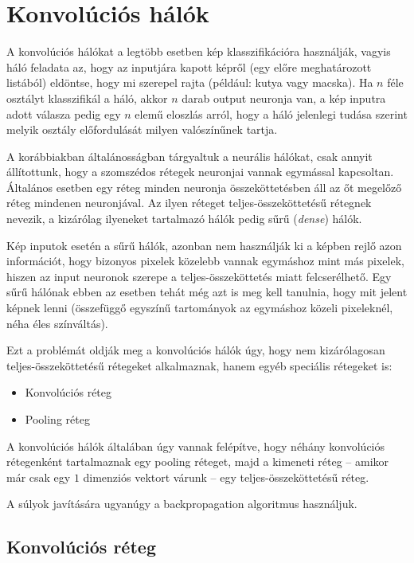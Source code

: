 \section{Konvolúciós hálók}

A konvolúciós hálókat \cite{ConvNet} a legtöbb esetben kép klasszifikációra használják, vagyis háló feladata az, hogy az inputjára kapott képről (egy előre meghatározott listából) eldöntse, hogy  mi szerepel rajta (például: kutya vagy macska). Ha $n$ féle osztályt klasszifikál a háló, akkor $n$ darab output neuronja van, a kép inputra adott válasza pedig egy $n$ elemű eloszlás arról, hogy a háló jelenlegi tudása szerint melyik osztály előfordulását milyen valószínűnek tartja.

A korábbiakban általánosságban tárgyaltuk a neurális hálókat, csak annyit állítottunk, hogy a szomszédos rétegek neuronjai vannak egymással kapcsoltan. Általános esetben egy réteg minden neuronja összeköttetésben áll az őt megelőző réteg mindenen neuronjával. Az ilyen réteget teljes-összeköttetésű rétegnek nevezik, a kizárólag ilyeneket tartalmazó hálók pedig sűrű (\emph{dense}) hálók.

Kép inputok esetén a sűrű hálók, azonban nem használják ki a képben rejlő azon információt, hogy bizonyos pixelek közelebb vannak egymáshoz mint más pixelek, hiszen az input neuronok szerepe a teljes-összeköttetés miatt felcserélhető. Egy sűrű hálónak ebben az esetben tehát még azt is meg kell tanulnia, hogy mit jelent képnek lenni (összefüggő egyszínű tartományok az egymáshoz közeli pixeleknél, néha éles színváltás).

Ezt a problémát oldják meg a konvolúciós hálók úgy, hogy nem kizárólagosan teljes-összeköttetésű rétegeket alkalmaznak, hanem egyéb speciális rétegeket is:

\begin{itemize}
  \item Konvolúciós réteg
  \item Pooling réteg
\end{itemize}

A konvolúciós hálók általában úgy vannak felépítve, hogy néhány konvolúciós rétegenként tartalmaznak egy pooling réteget, majd a kimeneti réteg -- amikor már csak egy $1$ dimenziós vektort várunk -- egy teljes-összeköttetésű réteg.

A súlyok javítására ugyanúgy a backpropagation algoritmus használjuk.

\subsection{Konvolúciós réteg}

